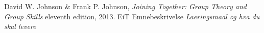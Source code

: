 \begin{thebibliography}{99}	%
		David W. Johnson \& Frank P. Johnson,
		\emph{Joining Together: Group Theory and Group Skills}
		eleventh edition,
		2013.
		EiT Emnebeskrivelse
		\emph{Laeringsmaal og hva du skal levere}
\end{thebibliography}